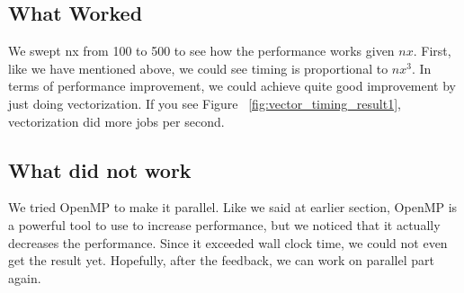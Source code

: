 \subsection{What Worked}
We swept nx from 100 to 500 to see how the performance works given $nx$. First, like we have mentioned above, we could see timing is proportional to $ nx^{3} $. In terms of performance improvement, we could achieve quite good improvement by just doing vectorization. If you see Figure ~\ref{fig:vector_timing_result1}, vectorization did more jobs per second. 

\subsection{What did not work}
We tried OpenMP to make it parallel. Like we said at earlier section, OpenMP is a powerful tool to use to increase performance, but we noticed that it actually decreases the performance. Since it exceeded wall clock time, we could not even get the result yet. Hopefully, after the feedback, we can work on parallel part again. 
